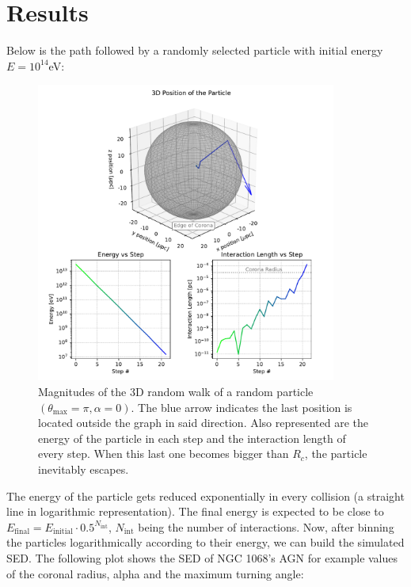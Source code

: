 \chapter{Results}
\label{chap:Results}

Below is the path followed by a randomly selected particle with initial energy $E=10^{14}$eV:

\begin{figure}[H]
    \includegraphics[width=0.88\textwidth]{Figures/example_random_walk.pdf}
    \centering
    \caption{Magnitudes of the 3D random walk of a random particle $(\theta_{\max}=\pi, \alpha=0)$. The blue arrow indicates the last position is located outside the graph in said direction. Also represented are the energy of the particle in each step and the interaction length of every step. When this last one becomes bigger than $R_c$, the particle inevitably escapes.}
    \label{fig:example_random_walk}
\end{figure}

The energy of the particle gets reduced exponentially in every collision (a straight line in logarithmic representation). The final energy is expected to be close to $E_\text{final} = E_\text{initial}\cdot 0.5^{N_{\text{int}}}$, $N_\text{int}$ being the number of interactions. Now, after binning the particles logarithmically according to their energy, we can build the simulated SED. The following plot shows the SED of NGC 1068's AGN for example values of the coronal radius, alpha and the maximum turning angle:

